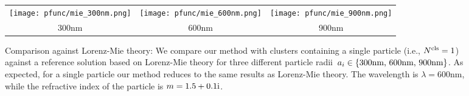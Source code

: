 \begin{figure}
    \centering
    \setlength{\resLen}{1.15in}
    \addtolength{\tabcolsep}{-6pt}
    \begin{tabular}{ccc}
        \texttt{[image: pfunc/mie\_300nm.png]} & 
        \texttt{[image: pfunc/mie\_600nm.png]} &  
        \texttt{[image: pfunc/mie\_900nm.png]}  
        \\
        300nm & 600nm & 900nm
    \end{tabular}
    \caption{\label{fig:mie}
    Comparison against Lorenz-Mie theory: We compare our method with clusters containing a single particle (i.e., ${N^\text{cls}}=1$) against a reference solution based on Lorenz-Mie theory for three different particle radii~$a_i \in \{ \text{300nm, 600nm, 900nm} \}$. As expected, for a single particle our method reduces to the same results as Lorenz-Mie theory. The wavelength is $\lambda=600$nm, while the refractive index of the particle is $m=1.5+0.1\text{i}$.  
}
\end{figure}
